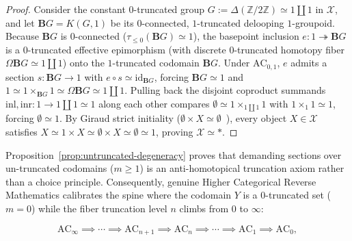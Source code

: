 \begin{proof}
Consider the constant $0$-truncated group $G := \Delta(\mathbb{Z}/2\mathbb{Z}) \simeq 1 \amalg 1$ in $\mathcal{X}$, and let $\mathbf{B}G = K(G, 1)$ be its $0$-connected, $1$-truncated delooping $1$-groupoid. Because $\mathbf{B}G$ is $0$-connected ($\tau_{\le 0}(\mathbf{B}G) \simeq 1$), the basepoint inclusion $e: 1 \twoheadrightarrow \mathbf{B}G$ is a $0$-truncated effective epimorphism (with discrete $0$-truncated homotopy fiber $\Omega\mathbf{B}G \simeq 1 \amalg 1$) onto the $1$-truncated codomain $\mathbf{B}G$. Under $\mathrm{AC}_{0, 1}$, $e$ admits a section $s: \mathbf{B}G \to 1$ with $e \circ s \simeq \mathrm{id}_{\mathbf{B}G}$, forcing $\mathbf{B}G \simeq 1$ and $1 \simeq 1 \times_{\mathbf{B}G} 1 \simeq \Omega\mathbf{B}G \simeq 1 \amalg 1$. Pulling back the disjoint coproduct summands $\mathrm{inl}, \mathrm{inr} : 1 \to 1 \amalg 1 \simeq 1$ along each other compares $\emptyset \simeq 1 \times_{1 \amalg 1} 1$ with $1 \times_1 1 \simeq 1$, forcing $\emptyset \simeq 1$. By Giraud strict initiality ($\emptyset \times X \simeq \emptyset$~\cite[Thm.~6.1.0.6]{Lurie09}), every object $X \in \mathcal{X}$ satisfies $X \simeq 1 \times X \simeq \emptyset \times X \simeq \emptyset \simeq 1$, proving $\mathcal{X} \simeq *$.
\end{proof}

Proposition~\ref{prop:untruncated-degeneracy} proves that demanding sections over un-truncated codomains ($m \ge 1$) is an anti-homotopical truncation axiom rather than a choice principle. Consequently, genuine Higher Categorical Reverse Mathematics calibrates the spine where the codomain $Y$ is a $0$-truncated set ($m = 0$) while the fiber truncation level $n$ climbs from $0$ to $\infty$:

\[
  \mathrm{AC}_\infty \implies \cdots \implies \mathrm{AC}_{n+1} \implies \mathrm{AC}_n \implies \cdots \implies \mathrm{AC}_1 \implies \mathrm{AC}_0,
\]

